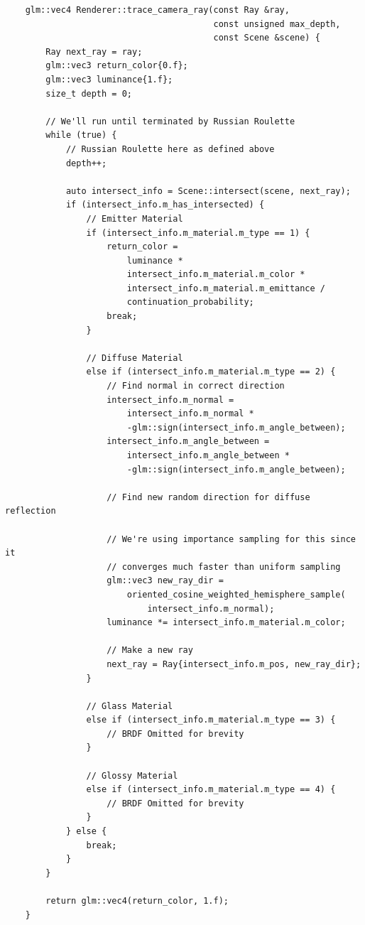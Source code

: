 \documentclass[
  twoside,
  11pt, a4paper,
  footinclude=true,
  headinclude=true,
  cleardoublepage=empty
]{scrreprt}
\begin{document}
\begin{verbatim}
    glm::vec4 Renderer::trace_camera_ray(const Ray &ray,
                                         const unsigned max_depth,
                                         const Scene &scene) {
        Ray next_ray = ray;
        glm::vec3 return_color{0.f};
        glm::vec3 luminance{1.f};
        size_t depth = 0;

        // We'll run until terminated by Russian Roulette
        while (true) {
            // Russian Roulette here as defined above
            depth++;

            auto intersect_info = Scene::intersect(scene, next_ray);
            if (intersect_info.m_has_intersected) {
                // Emitter Material
                if (intersect_info.m_material.m_type == 1) {
                    return_color =
                        luminance *
                        intersect_info.m_material.m_color *
                        intersect_info.m_material.m_emittance /
                        continuation_probability;
                    break;
                }

                // Diffuse Material
                else if (intersect_info.m_material.m_type == 2) {
                    // Find normal in correct direction
                    intersect_info.m_normal =
                        intersect_info.m_normal *
                        -glm::sign(intersect_info.m_angle_between);
                    intersect_info.m_angle_between =
                        intersect_info.m_angle_between *
                        -glm::sign(intersect_info.m_angle_between);

                    // Find new random direction for diffuse reflection

                    // We're using importance sampling for this since it
                    // converges much faster than uniform sampling
                    glm::vec3 new_ray_dir =
                        oriented_cosine_weighted_hemisphere_sample(
                            intersect_info.m_normal);
                    luminance *= intersect_info.m_material.m_color;

                    // Make a new ray
                    next_ray = Ray{intersect_info.m_pos, new_ray_dir};
                }

                // Glass Material
                else if (intersect_info.m_material.m_type == 3) {
                    // BRDF Omitted for brevity
                }

                // Glossy Material
                else if (intersect_info.m_material.m_type == 4) {
                    // BRDF Omitted for brevity
                }
            } else {
                break;
            }
        }

        return glm::vec4(return_color, 1.f);
    }
\end{verbatim} 
\end{document}
